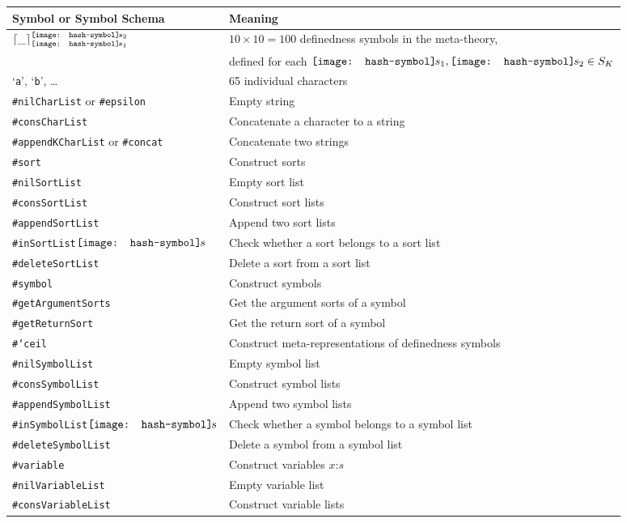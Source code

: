 \documentclass[UTF8,11pt]{article}
\theoremstyle{plain}
\theoremstyle{definition}
\theoremstyle{remark}
\DeclarePairedDelimiter{\ceil}{\lceil}{\rceil}
\newcommand{\cln}{\texttt{:}}
\newcommand{\parametric}[2]{{#1}\raisebox{.2ex}{\texttt{\footnotesize{\{}}}#2\raisebox{.2ex}{\texttt{\footnotesize{\}}}}}
\newcommand{\shp}{\texttt{[image: hash-symbol]}\kern-0.1em}
\newcommand{\smallshp}{\texttt{[image: hash-symbol]}\kern-0.1em}
\newcommand{\sharpsymbol}{\#}
\newcommand{\shs}{\shp s}
\newcommand{\smallshs}{\smallshp s}
\newcommand{\Kepsilon}{\texttt{\sharpsymbol epsilon}}
\newcommand{\Kconcat}{\texttt{\sharpsymbol concat}}
\newcommand{\Ksort}{\texttt{\sharpsymbol sort}}
\newcommand{\Ksymbol}{\texttt{\sharpsymbol symbol}}
\newcommand{\KSymbolceil}{\texttt{\sharpsymbol `ceil}}
\newcommand{\KgetArgumentSorts}{\texttt{\sharpsymbol getArgumentSorts}}
\newcommand{\KgetReturnSort}{\texttt{\sharpsymbol getReturnSort}}
\newcommand{\KnilKSortList}{\texttt{\sharpsymbol nilSortList}}
\newcommand{\KconsKSortList}{\texttt{\sharpsymbol consSortList}}
\newcommand{\KappendKSortList}{\texttt{\sharpsymbol appendSortList}}
\newcommand{\KinKSortList}{\texttt{\sharpsymbol inSortList}}
\newcommand{\KdeleteKSortList}{\texttt{\sharpsymbol deleteSortList}}
\newcommand{\KnilKSymbolList}{\texttt{\sharpsymbol nilSymbolList}}
\newcommand{\KconsKSymbolList}{\texttt{\sharpsymbol consSymbolList}}
\newcommand{\KappendKSymbolList}{\texttt{\sharpsymbol appendSymbolList}}
\newcommand{\KinKSymbolList}{\texttt{\sharpsymbol inSymbolList}}
\newcommand{\KdeleteKSymbolList}{\texttt{\sharpsymbol deleteSymbolList}}
\newcommand{\KnilKCharList}{\texttt{\sharpsymbol nilCharList}}
\newcommand{\KconsKCharList}{\texttt{\sharpsymbol consCharList}}
\newcommand{\KnilKVariableList}{\texttt{\sharpsymbol nilVariableList}}
\newcommand{\KconsKVariableList}{\texttt{\sharpsymbol consVariableList}}
\newcommand{\KappendKCharList}{\texttt{\sharpsymbol appendKCharList}}
\newcommand{\Kvariable}{\texttt{\sharpsymbol variable}}
\newcommand{\quottt}[1]{\textrm{\lq\texttt{#1}\rq}}
\begin{document}
\small
	\begin{longtable}{l|l}
	    \textbf{Symbol or Symbol Schema} & \textbf{Meaning} \\
	    \hline\hline
	    \endhead
	    $\ceil{\_}_{\smallshs_1}^{\smallshs_2}$ & $10 \times 10 = 100$ 
	    definedness symbols in the meta-theory, 
	    \\ & defined for each $\shs_1,\shs_2 \in 
	    S_K$ \\
	    \quottt{a}, \quottt{b}, \dots & 65 individual characters \\
	    {\KnilKCharList} or \Kepsilon & Empty string \\
	    \KconsKCharList & Concatenate a character to a string \\
	    {\KappendKCharList} or \Kconcat & Concatenate two strings \\
	    \Ksort & Construct sorts \\
	    \KnilKSortList & Empty sort list \\
	    \KconsKSortList & Construct sort lists \\
	    \KappendKSortList & Append two sort lists \\
	    \parametric{\KinKSortList}{$\shs$} & Check whether a sort belongs to a 
	    sort list \\
	    \KdeleteKSortList & Delete a sort from a sort list \\
	    \Ksymbol & Construct symbols \\
	    \KgetArgumentSorts & Get the argument sorts of a symbol \\
	    \KgetReturnSort & Get the return sort of a symbol \\
	    \KSymbolceil & Construct meta-representations of definedness symbols 
	    \\
	    \KnilKSymbolList & Empty symbol list \\
	    \KconsKSymbolList & Construct symbol lists \\
	    \KappendKSymbolList & Append two symbol lists \\
	    \parametric{\KinKSymbolList}{$\shs$} & Check whether a symbol belongs 
	    to a symbol list \\
	    \KdeleteKSymbolList & Delete a symbol from a symbol list \\
	    \Kvariable & Construct variables $x \cln s$ \\
	    \KnilKVariableList & Empty variable list \\
	    \KconsKVariableList & Construct variable lists \\

\end{longtable}
\end{document}
